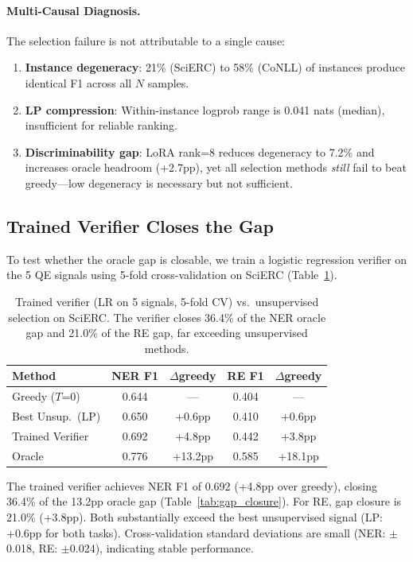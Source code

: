 \documentclass[11pt,a4paper]{article}
\begin{document}
\paragraph{Multi-Causal Diagnosis.} The selection failure is not attributable to a single cause:
\begin{enumerate}
    \item \textbf{Instance degeneracy}: 21\% (SciERC) to 58\% (CoNLL) of instances produce identical F1 across all $N$ samples.
    \item \textbf{LP compression}: Within-instance logprob range is 0.041 nats (median), insufficient for reliable ranking.
    \item \textbf{Discriminability gap}: LoRA rank=8 reduces degeneracy to 7.2\% and increases oracle headroom (+2.7pp), yet all selection methods \emph{still} fail to beat greedy---low degeneracy is necessary but not sufficient.
\end{enumerate}

\subsection{Trained Verifier Closes the Gap}
\label{sec:verifier}

To test whether the oracle gap is closable, we train a logistic regression verifier on the 5 QE signals using 5-fold cross-validation on SciERC (Table~\ref{tab:verifier}).

\begin{table}[t]
\centering
\small
\begin{tabular}{lcc cc}
\toprule
Method & NER F1 & $\Delta$greedy & RE F1 & $\Delta$greedy \\
\midrule
Greedy ($T$=0) & 0.644 & --- & 0.404 & --- \\
Best Unsup.\ (LP) & 0.650 & +0.6pp & 0.410 & +0.6pp \\
Trained Verifier & 0.692 & +4.8pp & 0.442 & +3.8pp \\
Oracle & 0.776 & +13.2pp & 0.585 & +18.1pp \\
\bottomrule
\end{tabular}
\caption{Trained verifier (LR on 5 signals, 5-fold CV) vs.\ unsupervised selection on SciERC. The verifier closes 36.4\% of the NER oracle gap and 21.0\% of the RE gap, far exceeding unsupervised methods.}
\label{tab:verifier}
\end{table}

The trained verifier achieves NER F1 of 0.692 (+4.8pp over greedy), closing 36.4\% of the 13.2pp oracle gap (Table~\ref{tab:gap_closure}). For RE, gap closure is 21.0\% (+3.8pp). Both substantially exceed the best unsupervised signal (LP: +0.6pp for both tasks). Cross-validation standard deviations are small (NER: $\pm$0.018, RE: $\pm$0.024), indicating stable performance.
\end{document}
